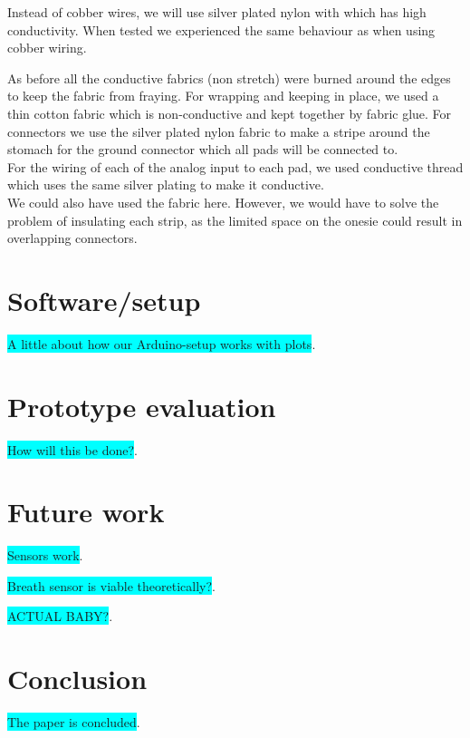 \documentclass{sigchi-ext}
\begin{document}
Instead of cobber wires, we will use silver plated nylon
with which has high conductivity. When tested we experienced
the same behaviour as when using cobber wiring.

As before all the conductive fabrics (non stretch) were 
burned around the edges to keep the fabric from fraying.
For wrapping and keeping in place, we used a thin cotton 
fabric which is non-conductive and kept together by
fabric glue.
For connectors we use the silver plated nylon fabric to make a stripe around
the stomach for the ground connector which all pads will be connected to.\\
For the wiring of each of the analog input to each pad, we used conductive thread
which uses the same silver plating to make it conductive.\\
We could also have used the fabric here. However, we would have to solve the problem
of insulating each strip, as the limited space on the onesie could result in overlapping
connectors.

\clearpage

\section{Software/setup}
\colorbox{cyan}{A little about how our Arduino-setup works with plots}.

\section{Prototype evaluation}
\colorbox{cyan}{How will this be done?}.

\section{Future work}
\colorbox{cyan}{Sensors work}.

\colorbox{cyan}{Breath sensor is viable theoretically?}.

\colorbox{cyan}{ACTUAL BABY?}.

\section{Conclusion}
\colorbox{cyan}{The paper is concluded}.




\balance{} 



\end{document}
